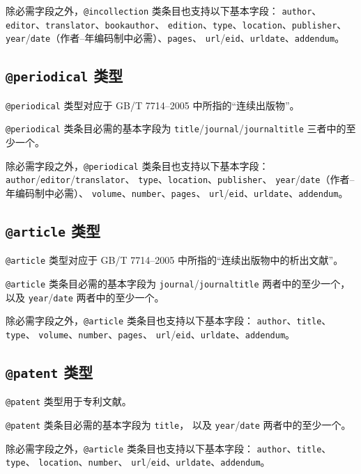 \documentclass[UTF8]{ctexart}
\begin{document}
除必需字段之外，\verb|@incollection| 类条目也支持以下基本字段：%
\verb|author|、\verb|editor|、\verb|translator|、\verb|bookauthor|、%
\verb|edition|、\verb|type|、\verb|location|、\verb|publisher|、%
\verb|year|/\verb|date|（作者--年编码制中必需）、\verb|pages|、%
\verb|url|/\verb|eid|、\verb|urldate|、\verb|addendum|。

\subsection{\texttt{@periodical} 类型}

\verb|@periodical| 类型对应于 GB/T 7714--2005 中所指的“连续出版物”。

\verb|@periodical| 类条目必需的基本字段为
\verb|title|/\verb|journal|/\verb|journaltitle| 三者中的至少一个。

除必需字段之外，\verb|@periodical| 类条目也支持以下基本字段：%
\verb|author|/\verb|editor|/\verb|translator|、%
\verb|type|、\verb|location|、\verb|publisher|、%
\verb|year|/\verb|date|（作者--年编码制中必需）、%
\verb|volume|、\verb|number|、\verb|pages|、%
\verb|url|/\verb|eid|、\verb|urldate|、\verb|addendum|。

\subsection{\texttt{@article} 类型}

\verb|@article| 类型对应于 GB/T 7714--2005 中所指的“连续出版物中的析出文献”。

\verb|@article| 类条目必需的基本字段为
\verb|journal|/\verb|journaltitle| 两者中的至少一个，
以及 \verb|year|/\verb|date| 两者中的至少一个。

除必需字段之外，\verb|@article| 类条目也支持以下基本字段：%
\verb|author|、\verb|title|、\verb|type|、%
\verb|volume|、\verb|number|、\verb|pages|、%
\verb|url|/\verb|eid|、\verb|urldate|、\verb|addendum|。

\subsection{\texttt{@patent} 类型}

\verb|@patent| 类型用于专利文献。

\verb|@patent| 类条目必需的基本字段为 \verb|title|，
以及 \verb|year|/\verb|date| 两者中的至少一个。

除必需字段之外，\verb|@article| 类条目也支持以下基本字段：%
\verb|author|、\verb|title|、\verb|type|、%
\verb|location|、\verb|number|、%
\verb|url|/\verb|eid|、\verb|urldate|、\verb|addendum|。
\end{document}
